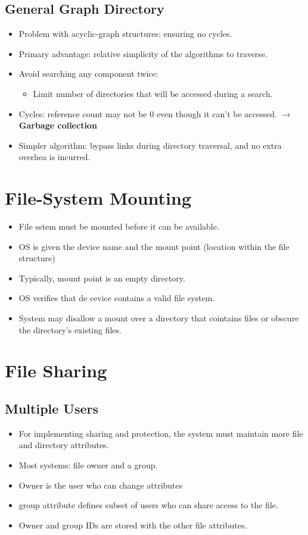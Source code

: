 \documentclass[10pt]{report}
\begin{document}
		\subsection{General Graph Directory}
			\begin{itemize}
					\item Problem with acyclic-graph structures: ensuring no cycles.
					\item Primary advantage: relative simplicity of the algorithms to traverse.
					\item Avoid searching any component twice:
					\begin{itemize}
							\item Limit number of directories that will be accessed during a search.
					\end{itemize}
					\item Cycles: reference count may not be 0 even though it can't be accessed. $\rightarrow$ \textbf{Garbage collection}
					\item Simpler algorithm: bypass links during directory traversal, and no extra overhea is incurred.
			\end{itemize}

	\section{File-System Mounting}
		\begin{itemize}
				\item File sstem must be mounted before it can be available.
				\item OS is given the device name and the mount point (location within the file structure)
				\item Typically, mount point is an empty directory.
				\item OS verifies that de cevice contains a valid file system.
				\item System may disallow a mount over a directory that cointains files or obscure the directory's existing files.
		\end{itemize}

	\section{File Sharing}
		\subsection{Multiple Users}
			\begin{itemize}
					\item For implementing sharing and protection, the system must maintain more file and directory attributes.
					\item Most systems: file owner and a group.
					\item Owner is the user who can change attributes
					\item group attribute defines subset of users who can share access to the file.
					\item Owner and group IDs are stored with the other file attributes.
			\end{itemize}
\end{document}
